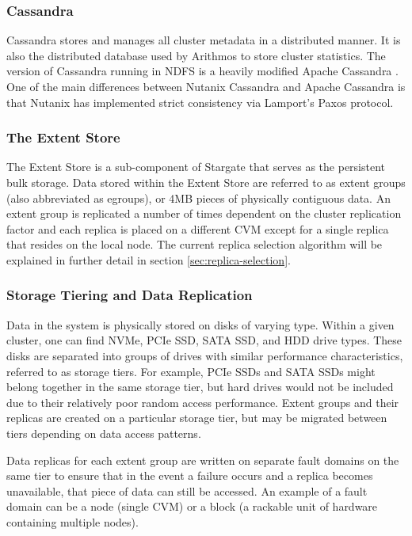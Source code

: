 \documentclass[12pt]{article}
\begin{document}
    \subsubsection{Cassandra}

    Cassandra stores and manages all cluster metadata in a distributed manner.
    It is also the distributed database used by Arithmos to store cluster
    statistics. The version of Cassandra running in NDFS is a heavily modified
    Apache Cassandra \cite{cassandra}. One of the main differences between
    Nutanix Cassandra and Apache Cassandra is that Nutanix has implemented
    strict consistency via Lamport's Paxos \cite{paxos2005} protocol.


    \subsubsection{The Extent Store}

    The Extent Store is a sub-component of Stargate that serves as the
    persistent bulk storage. Data stored within the Extent Store are referred
    to as extent groups (also abbreviated as egroups), or 4MB pieces of
    physically contiguous data. An extent group is replicated a number of
    times dependent on the cluster replication factor and each replica is
    placed on a different CVM except for a single replica that resides on the
    local node. The current replica selection algorithm will be explained in
    further detail in section \ref{sec:replica-selection}.

    \subsubsection{Storage Tiering and Data Replication}

    Data in the system is physically stored on disks of varying type. Within a
    given cluster, one can find NVMe, PCIe SSD, SATA SSD, and HDD drive types.
    These disks are separated into groups of drives with similar performance
    characteristics, referred to as storage tiers. For example, PCIe SSDs and
    SATA SSDs might belong together in the same storage tier, but hard drives
    would not be included due to their relatively poor random access
    performance. Extent groups and their replicas are created on a particular
    storage tier, but may be migrated between tiers depending on data access
    patterns.

    Data replicas for each extent group are written on separate fault domains
    on the same tier to ensure that in the event a failure occurs and a
    replica becomes unavailable, that piece of data can still be accessed. An
    example of a fault domain can be a node (single CVM) or a block (a rackable
    unit of hardware containing multiple nodes). 
\end{document}
